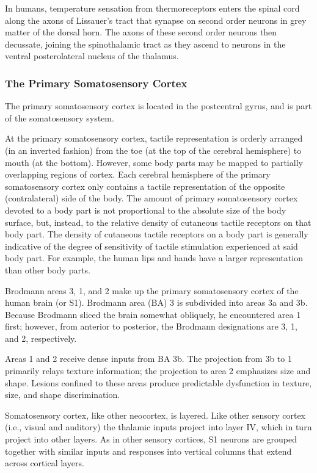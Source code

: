 In humans, temperature sensation from thermoreceptors enters the spinal
cord along the axons of Lissauer's tract that synapse on second order
neurons in grey matter of the dorsal horn. The axons of these second
order neurons then decussate, joining the spinothalamic tract as they
ascend to neurons in the ventral posterolateral nucleus of the thalamus.

\hypertarget{the-primary-somatosensory-cortex}{%
\subsubsection{The Primary Somatosensory
Cortex}\label{the-primary-somatosensory-cortex}}

The primary somatosensory cortex is located in the postcentral gyrus,
and is part of the somatosensory system.

At the primary somatosensory cortex, tactile representation is orderly
arranged (in an inverted fashion) from the toe (at the top of the
cerebral hemisphere) to mouth (at the bottom). However, some body parts
may be mapped to partially overlapping regions of cortex. Each cerebral
hemisphere of the primary somatosensory cortex only contains a tactile
representation of the opposite (contralateral) side of the body. The
amount of primary somatosensory cortex devoted to a body part is not
proportional to the absolute size of the body surface, but, instead, to
the relative density of cutaneous tactile receptors on that body part.
The density of cutaneous tactile receptors on a body part is generally
indicative of the degree of sensitivity of tactile stimulation
experienced at said body part. For example, the human lips and hands
have a larger representation than other body parts.

Brodmann areas 3, 1, and 2 make up the primary somatosensory cortex of
the human brain (or S1). Brodmann area (BA) 3 is subdivided into areas
3a and 3b. Because Brodmann sliced the brain somewhat obliquely, he
encountered area 1 first; however, from anterior to posterior, the
Brodmann designations are 3, 1, and 2, respectively.

Areas 1 and 2 receive dense inputs from BA 3b. The projection from 3b to
1 primarily relays texture information; the projection to area 2
emphasizes size and shape. Lesions confined to these areas produce
predictable dysfunction in texture, size, and shape discrimination.

Somatosensory cortex, like other neocortex, is layered. Like other
sensory cortex (i.e., visual and auditory) the thalamic inputs project
into layer IV, which in turn project into other layers. As in other
sensory cortices, S1 neurons are grouped together with similar inputs
and responses into vertical columns that extend across cortical layers.

